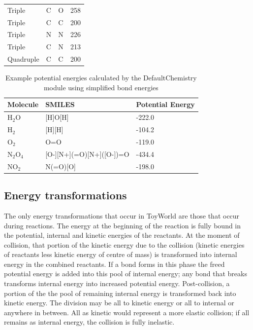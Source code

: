 \begin{table}[t]
\begin{center}
\begin{tabular}{@{}lp{2cm}p{2cm}p{2cm}@{}}
			Triple    & C      & O      & 258                                                  \\
			Triple    & C      & C      & 200                                                  \\
			Triple    & N      & N      & 226                                                  \\
			Triple    & C      & N      & 213                                                  \\
			Quadruple & C      & C      & 200                                                  \\
			\bottomrule
		\end{tabular}
	\end{center}
\end{table}

\begin{table}[t]
	\begin{center}
		\caption{Example potential energies calculated by the DefaultChemistry module using simplified bond energies}\label{example_potential_energies}
		\begin{tabular}{@{}p{3cm}p{5cm}p{2.5cm}@{}}
			\toprule
			Molecule   & SMILES                   & Potential Energy \\
			\midrule
			H$_2$O     & [H]O[H]                  & -222.0           \\
			H$_2$      & [H][H]                   & -104.2           \\
			O$_2$      & O=O                      & -119.0           \\
			N$_2$O$_4$ & [O-][N+](=O)[N+]([O-])=O & -434.4           \\
			NO$_2$     & N(=O)[O]                 & -198.0           \\
			\bottomrule
		\end{tabular}
	\end{center}
\end{table}%

\subsection{Energy transformations}\label{energy-transformations}

The only energy transformations that occur in ToyWorld are those that
occur during reactions. The energy at the beginning of the reaction is
fully bound in the potential, internal and kinetic energies of the
reactants. At the moment of collision, that portion of the kinetic
energy due to the collision (kinetic energies of reactants less kinetic
energy of centre of mass) is transformed into internal energy
in the combined reactants. If a bond forms in this phase
the freed potential energy is added into this pool of internal energy;
any bond that breaks transforms internal energy into increased potential
energy. Post-collision, a portion of the the pool of remaining internal
energy is transformed back into kinetic energy. The division may be all
to kinetic energy or all to internal or anywhere in between. All as
kinetic would represent a more elastic collision; if all remains as
internal energy, the collision is fully inelastic.

